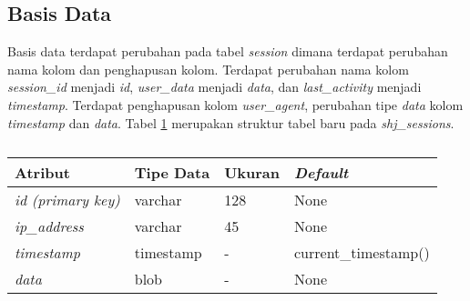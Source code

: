 \subsection{Basis Data}
Basis data terdapat perubahan pada tabel \textit{session} dimana terdapat perubahan nama kolom dan penghapusan kolom. Terdapat perubahan nama kolom \textit{session\_id} menjadi \textit{id}, \textit{user\_data} menjadi \textit{data}, dan \textit{last\_activity} menjadi \textit{timestamp}. Terdapat penghapusan kolom \textit{user\_agent}, perubahan tipe \textit{data} kolom \textit{timestamp} dan \textit{data}. Tabel \ref{tab:shjsessionbab5} merupakan struktur tabel baru pada \textit{shj\_sessions}.

\begin{table}[H]
\centering
\caption{}
\label{tab:shjsessionbab5}
\begin{tabular}{|l|l|l|l|}
\hline
\textbf{Atribut}          & \textbf{Tipe Data} & \textbf{Ukuran} & \textit{\textbf{Default}} \\ \hline
\textit{id (primary key)} & varchar            & 128             & None                      \\ \hline
\textit{ip\_address}       & varchar            & 45              & None                      \\ \hline
\textit{timestamp}        & timestamp          & -               & current\_timestamp()       \\ \hline
\textit{data}             & blob               & -               & None                      \\ \hline
\end{tabular}
\end{table}

